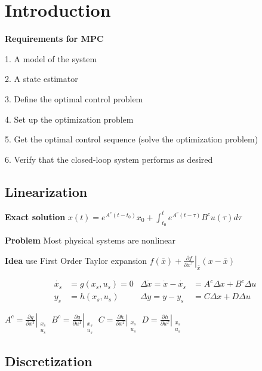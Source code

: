 \section{Introduction}

\textbf{Requirements for MPC}

1. A model of the system

2. A state estimator

3. Define the optimal control problem

4. Set up the optimization problem

5. Get the optimal control sequence (solve the optimization problem)

6. Verify that the closed-loop system performs as desired


\subsection{Linearization}

\textbf{Exact solution}
$x(t) = e^{A^c(t-t_0)}x_0 +
	\int_{t_0}^{t}e^{A^c(t-\tau)}B^c u(\tau)d\tau$

\textbf{Problem} Most physical systems are nonlinear

\textbf{Idea} use First Order Taylor expansion
$f(\bar{x}) + \left. \frac{\partial f}{\partial x^\top} \right
	\rvert_{\bar{x}} (x-\bar{x})$

\[\begin{aligned}
		\dot{x_s} & =g(x_s,u_s) = 0
		          & \Delta \dot{x}  =\dot{x} -\dot{x_s}
		          & = A^c\Delta x + B^c\Delta u
		\\
		y_s       & = h(x_s,u_s)
		          & \Delta y        = y - y_s
		          & = C\Delta x + D\Delta u
	\end{aligned} \]

$A^c= \left.\frac{\partial g}{\partial x^T}\right|_{\substack{x_s \\u_s}} $
$B^c= \left.\frac{\partial g}{\partial u^T}\right|_{\substack{x_s \\u_s}} $
$C= \left.\frac{\partial h}{\partial x^T}\right|_{\substack{x_s \\u_s}} $
$D= \left.\frac{\partial h}{\partial u^T}\right|_{\substack{x_s \\u_s}} $


\subsection{Discretization}

